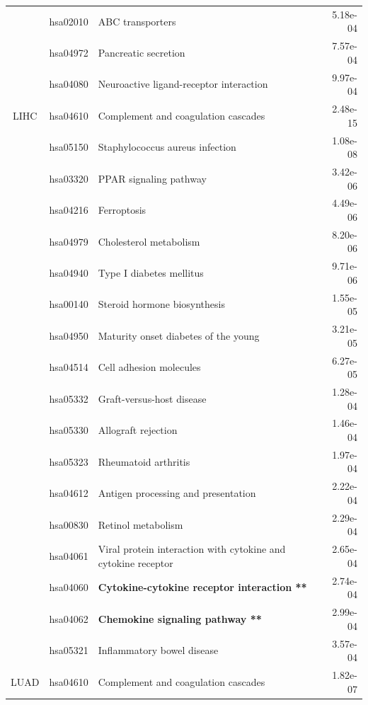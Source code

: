 \begin{longtable}{cllr}
 & hsa02010 & \textcolor{\clrnew}{ABC transporters} & 5.18e-04 \\ 
 & hsa04972 & \textcolor{\clrnew}{Pancreatic secretion} & 7.57e-04 \\ 
 & hsa04080 & \textcolor{\clrnew}{Neuroactive ligand-receptor interaction} & 9.97e-04 \\ 
\midrule 
\rowcolor{\clrmatch}LIHC & hsa04610 & Complement and coagulation cascades & 2.48e-15\\ 
 & hsa05150 & \textcolor{\clrnew}{Staphylococcus aureus infection} & 1.08e-08 \\ 
 & hsa03320 & \textcolor{\clrnew}{PPAR signaling pathway} & 3.42e-06 \\ 
 & hsa04216 & \textcolor{\clrnew}{Ferroptosis} & 4.49e-06 \\ 
 & hsa04979 & \textcolor{\clrnew}{Cholesterol metabolism} & 8.20e-06 \\ 
 & hsa04940 & \textcolor{\clrnew}{Type I diabetes mellitus} & 9.71e-06 \\ 
 & hsa00140 & \textcolor{\clrnew}{Steroid hormone biosynthesis} & 1.55e-05 \\ 
 & hsa04950 & \textcolor{\clrnew}{Maturity onset diabetes of the young} & 3.21e-05 \\ 
 & hsa04514 & \textcolor{\clrnew}{Cell adhesion molecules} & 6.27e-05 \\ 
 & hsa05332 & \textcolor{\clrnew}{Graft-versus-host disease} & 1.28e-04 \\ 
 & hsa05330 & \textcolor{\clrnew}{Allograft rejection} & 1.46e-04 \\ 
 & hsa05323 & \textcolor{\clrnew}{Rheumatoid arthritis} & 1.97e-04 \\ 
 & hsa04612 & \textcolor{\clrnew}{Antigen processing and presentation} & 2.22e-04 \\ 
 \rowcolor{\clrmatch}& hsa00830 & Retinol metabolism & 2.29e-04 \\ 
 & hsa04061 & \textcolor{\clrnew}{Viral protein interaction with cytokine and cytokine receptor} & 2.65e-04 \\ 
 \rowcolor{\clrpath}& hsa04060 & \textbf{Cytokine-cytokine receptor interaction **} & 2.74e-04 \\ 
 \rowcolor{\clrpath}& hsa04062 & \textbf{Chemokine signaling pathway **} & 2.99e-04 \\ 
 & hsa05321 & \textcolor{\clrnew}{Inflammatory bowel disease} & 3.57e-04 \\ 
\midrule 
LUAD & hsa04610 & \textcolor{\clrnew}{Complement and coagulation cascades} & 1.82e-07\\ 

\end{longtable}
